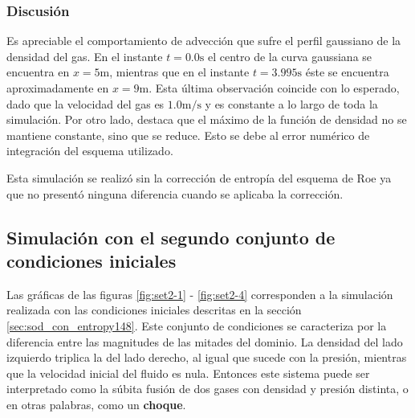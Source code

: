 \subsubsection{Discusión}
Es apreciable el comportamiento de advección que sufre el perfil gaussiano de la densidad del gas. En el instante $t=0.0\unit{\s}$ el centro de la curva gaussiana se encuentra en $x=5\unit{\meter}$, mientras que en el instante $t=3.995\unit{\s}$ éste se encuentra aproximadamente en $x=9\unit{\meter}$. Esta última observación coincide con lo esperado, dado que la velocidad del gas es $1.0\unit{\meter\per\s}$ y es constante a lo largo de toda la simulación.
Por otro lado, destaca que el máximo de la función de densidad no se mantiene constante, sino que se reduce. Esto se debe al error numérico de integración del esquema utilizado.

Esta simulación se realizó sin la corrección de entropía del esquema de Roe ya que no presentó ninguna diferencia cuando se aplicaba la corrección.

\subsection{Simulación con el segundo conjunto de condiciones iniciales}
\label{sec:resultados-set-2}
Las gráficas de las figuras \ref{fig:set2-1} - \ref{fig:set2-4} corresponden a la simulación realizada con las condiciones iniciales descritas en la sección \ref{sec:sod_con_entropy148}. Este conjunto de condiciones se caracteriza por la diferencia entre las magnitudes de las mitades del dominio. La densidad del lado izquierdo triplica la del lado derecho, al igual que sucede con la presión, mientras que la velocidad inicial del fluido es nula. Entonces este sistema puede ser interpretado como la súbita fusión de dos gases con densidad y presión distinta, o en otras palabras, como un \textbf{choque}.
